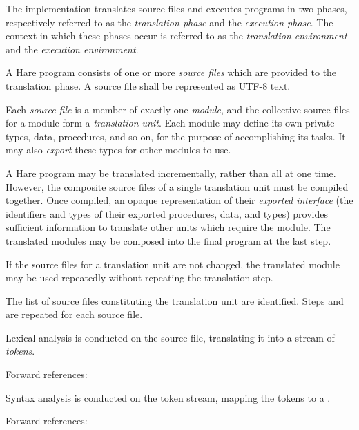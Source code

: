 
\specitem
The implementation translates source files and executes programs in two phases,
respectively referred to as the \textit{translation phase} and the
\textit{execution phase}. The context in which these phases occur is referred
to as the \textit{translation environment} and the \textit{execution
environment}.


\specsubitem
A Hare program consists of one or more \textit{source files} which are provided
to the translation phase. A source file shall be represented as \hbox{UTF-8}
text.

\specsubitem
Each \textit{source file} is a member of exactly one \textit{module}, and the
collective source files for a module form a \textit{translation unit}. Each
module may define its own private types, data, procedures, and so on, for the
purpose of accomplishing its tasks. It may also \textit{export} these types for
other modules to use.

\specsubitem
A Hare program may be translated incrementally, rather than all at one time.
However, the composite source files of a single translation unit must be
compiled together. Once compiled, an opaque representation of their
\textit{exported interface} (the identifiers and types of their exported
procedures, data, and types) provides sufficient information to translate other
units which require the module. The translated modules may be composed into the
final program at the last step.

\specsubitem
If the source files for a translation unit are not changed, the translated
module may be used repeatedly without repeating the translation step.


\specsubitem
The list of source files constituting the translation unit are identified. Steps
 and  are
repeated for each source file.

\specsubitem
Lexical analysis is conducted on the source file, translating it into a stream
of \textit{tokens}.

Forward references: 

\specsubitem
Syntax analysis is conducted on the token stream, mapping the tokens to a
.

Forward references: 

